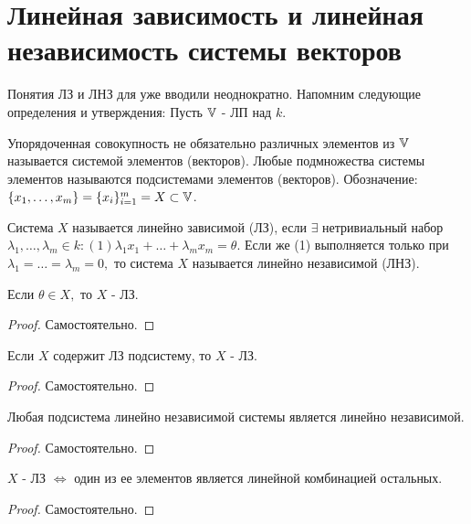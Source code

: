 \documentclass[../main.tex]{subfiles}
\begin{document}
\section{Линейная зависимость и линейная независимость системы векторов}
Понятия ЛЗ и ЛНЗ для уже вводили неоднократно. Напомним следующие определения и утверждения: Пусть $\mathbb{V} $ - ЛП над $k$. 
\begin{definition}
    Упорядоченная совокупность не обязательно различных элементов из $\mathbb{V}$ называется системой элементов (векторов). Любые подмножества системы элементов называются подсистемами элементов (векторов). Обозначение: $\{x_{1},\dots,x_{m}\}=\{x_{i}\}_{i=1}^{m}=X\subset \mathbb{V}$. 
\end{definition}
\begin{definition}
    Система $X$ называется линейно зависимой (ЛЗ), если $\exists$ нетривиальный набор $\lambda_{1},\dots,\lambda_{m}\in k: (1) \lambda_{1}x_{1}+\dots+\lambda_{m}x_{m}=\theta$. Если же (1) выполняется только при $\lambda_{1}=\dots=\lambda_{m}=0,$ то система $X$ называется линейно независимой (ЛНЗ).
\end{definition}
\begin{theorem}
    Если $\theta \in X,$ то $X$ - ЛЗ.
\end{theorem}
\begin{proof}
    Самостоятельно.
\end{proof}
\begin{theorem}
    Если $X$ содержит ЛЗ подсистему, то $X$ - ЛЗ. 
\end{theorem}
\begin{proof}
    Самостоятельно.
\end{proof}
\begin{theorem}
    Любая подсистема линейно независимой системы является линейно независимой.
\end{theorem}
\begin{proof}
    Самостоятельно.
\end{proof}
\begin{theorem}[Критерий ЛЗ]
    $X$ - ЛЗ $\Leftrightarrow$ один из ее элементов является линейной комбинацией остальных.
\end{theorem}
\begin{proof}
    Самостоятельно.
\end{proof}
\end{document}

